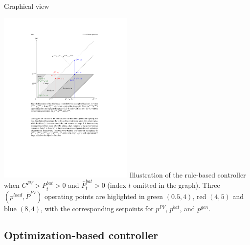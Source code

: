 \begin{frame}[label={RBC_example}]{Graphical view}
\begin{multicols}{2}
\includegraphics[width=0.5\textwidth]{images/RB_graphical.pdf}
Illustration of the rule-based controller when $C^{PV} > \underline{P}^{bat}_t > 0$ and $\bar{P}^{bat}_t >0$ (index $t$ omitted in the graph).  Three $(p^{load}, \bar{P}^{PV})$ operating points are higlighted in green $(0.5,4)$, red $(4,5)$ and blue $(8,4)$, with the corresponding setpoints for $p^{PV}$, $p^{bat}$, and $p^{gen}$.
\end{multicols}
\end{frame}

\subsection{Optimization-based controller}

